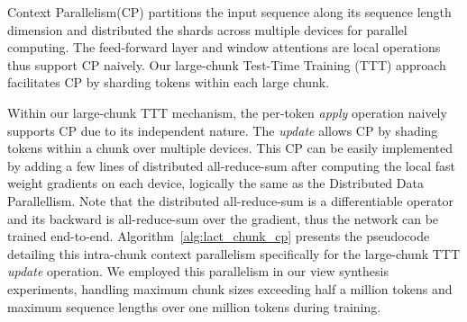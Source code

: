 \documentclass{article}
\begin{document}
Context Parallelism(CP) partitions the input sequence along its sequence length dimension and distributed the shards across multiple devices for parallel computing. The feed-forward layer and window attentions are local operations thus support CP naively.  Our large-chunk Test-Time Training (TTT) approach facilitates CP by sharding tokens within each large chunk.

Within our large-chunk TTT mechanism, the per-token \textit{apply} operation naively supports CP due to its independent nature. The \textit{update} allows CP by shading tokens within a chunk over multiple devices. This CP can be easily implemented by adding a few lines of distributed all-reduce-sum after computing the local fast weight gradients on each device, logically the same as the Distributed Data Parallellism.  
Note that the distributed all-reduce-sum is a differentiable operator and its backward is all-reduce-sum over the gradient, thus the network can be trained end-to-end.
Algorithm~\ref{alg:lact_chunk_cp} presents the pseudocode detailing this intra-chunk context parallelism specifically for the large-chunk TTT \textit{update} operation. We employed this parallelism in our view synthesis experiments, handling maximum chunk sizes exceeding half a million tokens and maximum sequence lengths over one million tokens during training.
\end{document}
